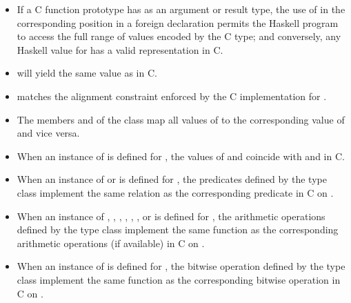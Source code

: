 \begin{itemize}
\item
 If a C function prototype has  as an argument or result type, the
  use of  in the corresponding position in a foreign declaration
  permits the Haskell program to access the full range of values encoded
  by the C type; and conversely, any Haskell value for  has a valid
  representation in C.
\par

\item
  will yield the same value as
   in C.
\par

\item
  matches the alignment
  constraint enforced by the C implementation for .
\par

\item
 The members  and  of the  class map all values
  of  to the corresponding value of  and vice versa.
\par

\item
 When an instance of  is defined for , the values
  of  and  coincide with 
  and  in C.
\par

\item
 When an instance of  or  is defined for ,
  the predicates defined by the type class implement the same relation
  as the corresponding predicate in C on .
\par

\item
 When an instance of , , ,
  , , , or
   is defined for , the arithmetic operations
  defined by the type class implement the same function as the
  corresponding arithmetic operations (if available) in C on .
\par

\item
 When an instance of  is defined for , the bitwise operation
  defined by the type class implement the same function as the
  corresponding bitwise operation in C on .
\par

\end{itemize}

